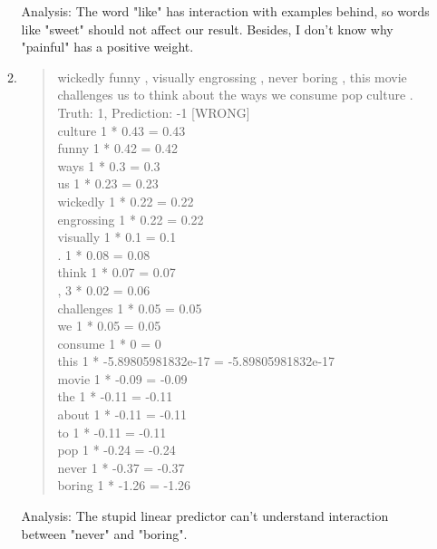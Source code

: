 \documentclass[12pt]{article}
\begin{document}
\begin{enumerate}[label=(\alph*)]
\begin{enumerate}[label=\arabic*.]
\begin{quote}
      \end{quote}
    Analysis: The word "like" has interaction with examples behind, so words like "sweet" should not affect our result. Besides, I don't know why "painful" has a positive weight.
    \item
      \begin{quote}
        wickedly funny , visually engrossing , never boring , this movie challenges us to think about the ways we consume pop culture . \\
Truth: 1, Prediction: -1 [WRONG] \\
culture                       1 * 0.43 = 0.43 \\
funny                         1 * 0.42 = 0.42 \\
ways                          1 * 0.3 = 0.3 \\
us                            1 * 0.23 = 0.23 \\
wickedly                      1 * 0.22 = 0.22 \\
engrossing                    1 * 0.22 = 0.22 \\
visually                      1 * 0.1 = 0.1 \\
.                             1 * 0.08 = 0.08 \\
think                         1 * 0.07 = 0.07 \\
,                             3 * 0.02 = 0.06 \\ 
challenges                    1 * 0.05 = 0.05 \\
we                            1 * 0.05 = 0.05 \\
consume                       1 * 0 = 0 \\
this                          1 * -5.89805981832e-17 = -5.89805981832e-17 \\
movie                         1 * -0.09 = -0.09 \\
the                           1 * -0.11 = -0.11 \\
about                         1 * -0.11 = -0.11 \\
to                            1 * -0.11 = -0.11 \\
pop                           1 * -0.24 = -0.24 \\
never                         1 * -0.37 = -0.37 \\
boring                        1 * -1.26 = -1.26
      \end{quote}
    Analysis: The stupid linear predictor can't understand interaction between "never" and "boring".

\end{enumerate}
\end{enumerate}
\end{document}
